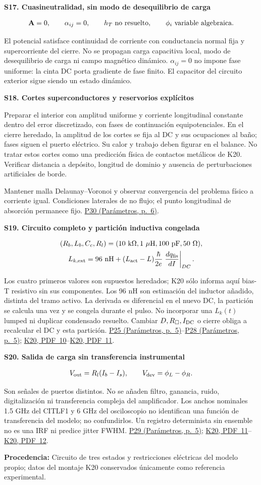 \documentclass[11pt,a4paper]{article}
\newcommand{\block}[1]{\par\vspace{6pt}{\large\bfseries\color{ink}#1}\par\vspace{3pt}}
\newcommand{\origin}[1]{\par{\footnotesize\raggedright\color{ink}\textbf{Procedencia:} #1\par}}
\newcommand{\K}[1]{\href{https://eprints.lancs.ac.uk/id/eprint/140252/3/Binder1.pdf\#page=#1}{K20, PDF~#1}}
\newcommand{\pref}[2]{\href{Parametros.pdf\#nameddest=#1}{#1 (Parámetros, p.~#2)}}
\newcommand{\assumption}[2]{\par\vspace{6pt}\hypertarget{#1}{\textbf{\color{ink}#1. #2}}\par}
\newcommand{\smallnote}[1]{{\small #1\par}}
\begin{document}
\block{Electricidad, bordes y lectura}
\assumption{S17}{Cuasineutralidad, sin modo de desequilibrio de carga}
\begin{gather*}
 \mathbf A=0,\qquad\alpha_{ij}=0,\qquad
 h_T\ \hbox{no resuelto},\qquad
 \phi_i\ \hbox{variable algebraica}.
\end{gather*}
\smallnote{El potencial satisface continuidad de corriente con conductancia normal fija y supercorriente del cierre. No se propagan carga capacitiva local, modo de desequilibrio de carga ni campo magnético dinámico. $\alpha_{ij}=0$ no impone fase uniforme: la cinta DC porta gradiente de fase finito. El capacitor del circuito exterior sigue siendo un estado dinámico.}
\assumption{S18}{Cortes superconductores y reservorios explícitos}
\smallnote{Preparar el interior con amplitud uniforme y corriente longitudinal constante dentro del error discretizado, con fases de continuación equipotenciales. En el cierre heredado, la amplitud de los cortes se fija al DC y sus ocupaciones al baño; fases siguen el puerto eléctrico. Su calor y trabajo deben figurar en el balance. No tratar estos cortes como una predicción física de contactos metálicos de K20. Verificar distancia a depósito, longitud de dominio y ausencia de perturbaciones artificiales de borde.}
\smallnote{Mantener malla Delaunay--Voronoi y observar convergencia del problema físico a corriente igual. Condiciones laterales de no flujo; el punto longitudinal de absorción permanece fijo. \pref{P30}{6}.}
\assumption{S19}{Circuito completo y partición inductiva congelada}
\begin{gather*}
 (R_b,L_b,C_c,R_l)=(10\ {\rm k}\Omega,1\ \mu{\rm H},100\ {\rm pF},50\ \Omega),\\
 L_{k,\rm ext}=96\ {\rm nH}
 +(L_{\rm act}-L)\frac{\hbar}{2e}
 \left.\frac{dq_{\rm fis}}{dI}\right|_{DC}.
\end{gather*}
\smallnote{Los cuatro primeros valores son supuestos heredados; K20 sólo informa aquí bias-T resistivo sin sus componentes. Los 96 nH son estimación del inductor añadido, distinta del tramo activo. La derivada es diferencial en el nuevo DC, la partición se calcula una vez y se congela durante el pulso. No incorporar una $L_k(t)$ lumped ni duplicar condensado resuelto. Cambiar $D,R_\square,I_{\rm DC}$ o cierre obliga a recalcular el DC y esta partición. \pref{P25}{5}--\pref{P28}{5}; \K{10}--\K{11}.}
\assumption{S20}{Salida de carga sin transferencia instrumental}
\begin{gather*}
 V_{\rm out}=R_l(I_b-I_s),\qquad V_{\rm dev}=\phi_L-\phi_R .
\end{gather*}
\smallnote{Son señales de puertos distintos. No se añaden filtro, ganancia, ruido, digitalización ni transferencia compleja del amplificador. Los anchos nominales 1.5 GHz del CITLF1 y 6 GHz del osciloscopio no identifican una función de transferencia del modelo; no confundirlos. Un registro determinista sin ensemble no es una IRF ni predice jitter FWHM. \pref{P29}{5}; \K{11}--\K{12}.}
\vfill
\origin{Circuito de tres estados y restricciones eléctricas del modelo propio; datos del montaje K20 conservados únicamente como referencia experimental.}
\newpage
\end{document}
